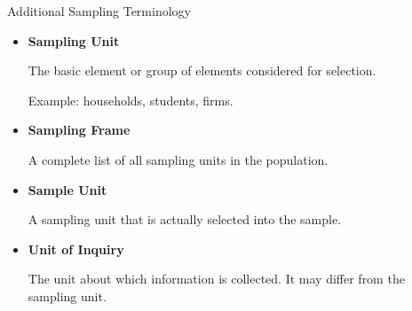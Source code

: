 \documentclass[12pt, aspectratio=169]{beamer}
\begin{document}
    \begin{frame}{Additional Sampling Terminology}
        \begin{itemize}
            \item \textbf{Sampling Unit}

            The basic element or group of elements considered for selection.

            Example: households, students, firms.

            \item \textbf{Sampling Frame}

            A complete list of all sampling units in the population.

            \item \textbf{Sample Unit}

            A sampling unit that is actually selected into the sample.

            \item \textbf{Unit of Inquiry}

            The unit about which information is collected. It may differ from the sampling unit.
        \end{itemize}
    \end{frame}
\end{document}
